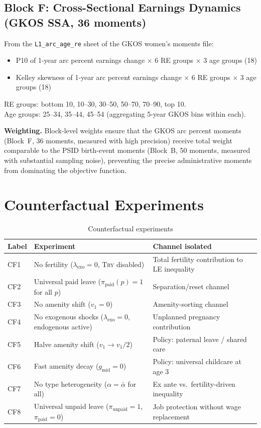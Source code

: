\documentclass[11pt]{article}
\begin{document}
\subsection{Block F: Cross-Sectional Earnings Dynamics (GKOS SSA, 36 moments)}

From the \texttt{L1\_arc\_age\_re} sheet of the GKOS women's moments file:
\begin{itemize}[nosep]
  \item P10 of 1-year arc percent earnings change $\times$ 6 RE groups $\times$ 3 age groups \hfill (18)
  \item Kelley skewness of 1-year arc percent earnings change $\times$ 6 RE groups $\times$ 3 age groups \hfill (18)
\end{itemize}
RE groups: bottom 10, 10--30, 30--50, 50--70, 70--90, top 10. \\
Age groups: 25--34, 35--44, 45--54 (aggregating 5-year GKOS bins within each).

\bigskip\noindent\textbf{Weighting.} Block-level weights ensure that the GKOS arc percent moments (Block~F, 36 moments, measured with high precision) receive total weight comparable to the PSID birth-event moments (Block~B, 50 moments, measured with substantial sampling noise), preventing the precise administrative moments from dominating the objective function.

\section{Counterfactual Experiments}

\begin{table}[h]\centering
\caption{Counterfactual experiments}
\begin{tabular}{lll}
\toprule
Label & Experiment & Channel isolated \\
\midrule
CF1 & No fertility ($\lambda_{\text{exo}} = 0$, \textsc{Try} disabled) & Total fertility contribution to LE inequality \\
CF2 & Universal paid leave ($\pi_{\text{paid}}(p) = 1$ for all $p$) & Separation/reset channel \\
CF3 & No amenity shift ($v_1 = 0$) & Amenity-sorting channel \\
CF4 & No exogenous shocks ($\lambda_{\text{exo}} = 0$, endogenous active) & Unplanned pregnancy contribution \\
CF5 & Halve amenity shift ($v_1 \to v_1/2$) & Policy: paternal leave / shared care \\
CF6 & Fast amenity decay ($g_{\text{mid}} = 0$) & Policy: universal childcare at age 3 \\
CF7 & No type heterogeneity ($\alpha = \bar\alpha$ for all) & Ex ante vs.\ fertility-driven inequality \\
CF8 & Universal unpaid leave ($\pi_{\text{unpaid}} = 1$, $\pi_{\text{paid}} = 0$) & Job protection without wage replacement \\
\bottomrule
\end{tabular}
\end{table}
\end{document}
